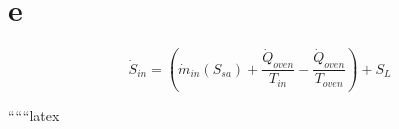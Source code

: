 

\section*{e}
\begin{equation*}
\dot{S}_{in} = (\dot{m}_{in} (S_{sa}) + \frac{\dot{Q}_{oven}}{T_{in}} - \frac{\dot{Q}_{oven}}{T_{oven}}) + S_{L}
\end{equation*}

``````latex